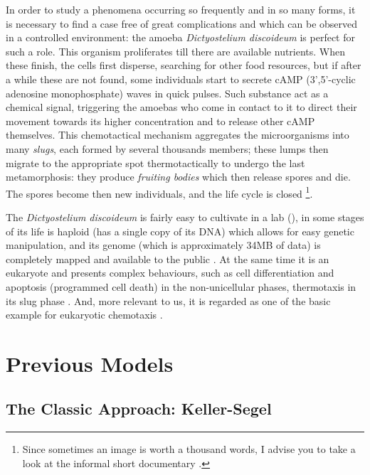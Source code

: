 In order to study a phenomena occurring so frequently and in so many forms, it is necessary to find a case free of great complications and which can be observed in a controlled environment: the amoeba \emph{Dictyostelium discoideum} is perfect for such a role.
This organism proliferates till there are available nutrients.
When these finish, the cells first disperse, searching for other food resources, but if after a while these are not found, some individuals start to secrete cAMP (3',5'-cyclic adenosine monophosphate) waves in quick pulses.
Such substance act as a chemical signal, triggering the amoebas who come in contact to it to direct their movement towards its higher concentration and to release other cAMP themselves.
This chemotactical mechanism aggregates the microorganisms into many \emph{slugs}, each formed by several thousands members; these lumps then migrate to the appropriate spot thermotactically to undergo the last metamorphosis: they produce \emph{fruiting bodies} which then release spores and die.
The spores become then new individuals, and the life cycle is closed
\footnote[1]{Since sometimes an image is worth a thousand words, I advise you to take a look at the informal short documentary \cite{ze-frank}.}.


The \emph{Dictyostelium discoideum} is fairly easy to cultivate in a lab (\cite[Chpater 4]{dd-in-lab}), in some stages of its life is haploid (\ie has a single copy of its DNA) which allows for easy genetic manipulation, and its genome (which is approximately 34MB of data) is completely mapped and available to the public \cite{dd-bioinfo-lj}.
At the same time it is an eukaryote and presents complex behaviours, such as cell differentiation and apoptosis (programmed cell death) in the non-unicellular phases, thermotaxis in its slug phase \cite{thermotaxis-dd}.
And, more relevant to us, it is regarded as one of the basic example for eukaryotic chemotaxis \cite{chemotaxis-cancer-and-simpler-models}.

\section{Previous Models}

\subsection{The Classic Approach: Keller-Segel}

